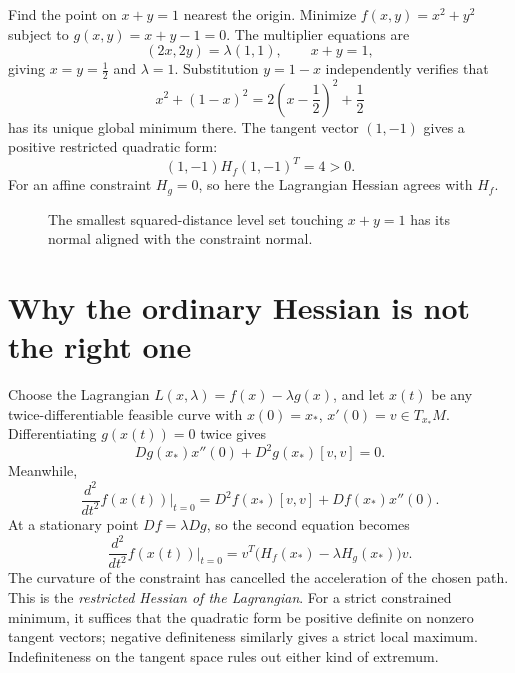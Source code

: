 \begin{example}
Find the point on $x+y=1$ nearest the origin. Minimize
$f(x,y)=x^2+y^2$ subject to $g(x,y)=x+y-1=0$. The multiplier equations are
\[
 (2x,2y)=\lambda(1,1),\qquad x+y=1,
\]
giving $\boxed{x=y=\frac12}$ and $\lambda=1$. Substitution $y=1-x$ independently verifies that
\[
 x^2+(1-x)^2=2\left(x-\frac12\right)^2+\frac12
\]
has its unique global minimum there. The tangent vector $(1,-1)$ gives a positive restricted quadratic form:
\[
 (1,-1)H_f(1,-1)^T=4>0.
\]
For an affine constraint $H_g=0$, so here the Lagrangian Hessian agrees with $H_f$.

\begin{figure}[H]
\centering
{}
\caption{The smallest squared-distance level set touching $x+y=1$ has its normal aligned with the constraint normal.}
\end{figure}
\end{example}

\section{Why the ordinary Hessian is not the right one}

Choose the Lagrangian \(L(x,\lambda)=f(x)-\lambda g(x)\), and let \(x(t)\) be any twice-differentiable feasible curve with \(x(0)=x_*\), \(x'(0)=v\in T_{x_*}M\). Differentiating \(g(x(t))=0\) twice gives
\[
 Dg(x_*)x''(0)+D^2g(x_*)[v,v]=0.
\]
Meanwhile,
\[
 \frac{d^2}{dt^2}f(x(t))\Big|_{t=0}
 =D^2f(x_*)[v,v]+Df(x_*)x''(0).
\]
At a stationary point \(Df=\lambda Dg\), so the second equation becomes
\[
 \boxed{\frac{d^2}{dt^2}f(x(t))\Big|_{t=0}
 =v^T\bigl(H_f(x_*)-\lambda H_g(x_*)\bigr)v.}
\]
The curvature of the constraint has cancelled the acceleration of the chosen path. This is the \emph{restricted Hessian of the Lagrangian}. For a strict constrained minimum, it suffices that the quadratic form be positive definite on nonzero tangent vectors; negative definiteness similarly gives a strict local maximum. Indefiniteness on the tangent space rules out either kind of extremum.


